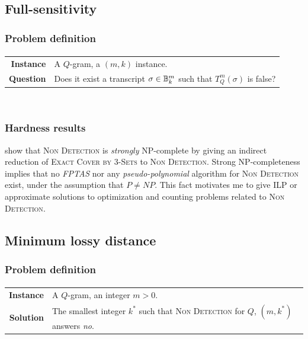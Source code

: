 \subsection{Full-sensitivity}
\label{sub:qgram-full-sensitivity}


\subsubsection{Problem definition}

\paragraph{}
\begin{tabular}{rl}
{\bf Instance}	&	A $Q$-gram, a $(m,k)$ instance. \\
{\bf Question}	&	Does it exist a transcript $\sigma \in \mathbb {B}^{m}_{k}$ such that $T_{Q}^{m}(\sigma)$ is false? \\
\end{tabular}
\\

\subsubsection{Hardness results}

\cite{Nicolas2005} show that \textsc{Non Detection} is \emph{strongly} NP-complete by giving an indirect reduction of \textsc{Exact Cover by 3-Sets} to \textsc{Non Detection}.
Strong NP-completeness implies that no \emph{FPTAS} nor any \emph{pseudo-polynomial} algorithm for \textsc{Non Detection} exist, under the assumption that $P \neq NP$.
This fact motivates me to give ILP or approximate solutions to optimization and counting problems related to \textsc{Non Detection}.

\subsection{Minimum lossy distance}
\label{sub:qgram-min-lossy-distance}

\subsubsection{Problem definition}

\paragraph{}
\begin{tabular}{rl}
{\bf Instance}	&	A $Q$-gram, an integer $m > 0$.\\
{\bf Solution}	&	The smallest integer $k^*$ such that \textsc{Non Detection} for $Q$, $(m,k^*)$ answers \emph{no}.\\
\end{tabular}
\\

